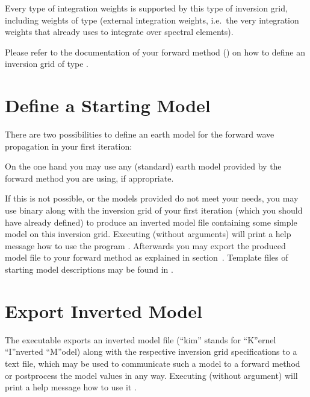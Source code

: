 Every type of integration weights is supported by this type of inversion grid, including weights of type 
 (external integration weights, i.e.\ the very integration weights that already 
uses to integrate over spectral elements).

Please refer to the documentation of your  forward method ()
on how to define an inversion grid of type .
%
\section{Define a Starting Model} \label{basic_steps,sec:start_model}
%
There are two possibilities to define an earth model for the forward wave propagation in your first iteration:

On the one hand you may use any (standard) earth model provided by the forward method you are using, if appropriate.

If this is not possible, or the models provided do not meet your needs, you may use binary 
 along with the inversion grid of your first iteration (which you should 
have already defined) to produce an inverted model file containing some simple model on this inversion grid. 
Executing  (without arguments) will print a help message how to use the program 
. Afterwards you may 
export the produced model file to your forward method as explained in section~.
Template files of starting model descriptions may be found in .
%
\section{Export Inverted Model} \label{basic_steps,sec:export_kim}
%
The executable  exports an inverted model file (``kim'' stands for ``K''ernel 
``I''nverted ``M''odel) along with the respective inversion grid specifications to a text file, 
which may be used to communicate such a model to a forward method or postprocess the model values in any way. 
Executing  (without argument) will print a help message how to use it 
.
%
